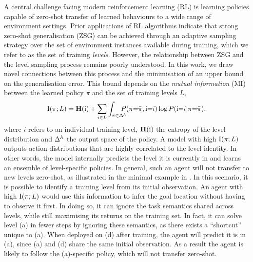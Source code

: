\documentclass{article}
\theoremstyle{plain}
\theoremstyle{definition}
\theoremstyle{remark}
\begin{document}
A central challenge facing modern reinforcement learning (RL) is learning policies capable of zero-shot transfer of learned behaviours to a wide range of environment settings. Prior applications of RL algorithms \citep{rubiks,CLrobloc,fastCLrobloc} indicate that strong zero-shot generalisation (ZSG) can be achieved through an adaptive sampling strategy over the set of environment instances available during training, which we refer to as the set of training \textit{levels}. However, the relationship between ZSG and the level sampling process remains poorly understood. In this work, we draw novel connections between this process and the minimisation of an upper bound on the generalisation error. This bound depends on the \textit{mutual information} (MI) between the learned policy $\pi$ and the set of training levels $L$,
\begin{equation} \label{eq:MI}
\noindent
    \mut{\pi}{L} = \entropy(\ri) + \sum_{i\in L} \int_{\bar{\pi} \in \Delta^\sA}\hspace{-1em} P(\pi{=}\bar{\pi}, \ri{=}i) \log P(\ri{=}i |\pi{=}\bar{\pi}),
\end{equation}
where $i$ refers to an individual training level, $\mathbf{H}({\textnormal{i}})$ the entropy of the level distribution and $\Delta^{\mathbb{A}}$ the output space of the policy. A model with high $\text{I}(\pi;L)$ outputs action distributions that are highly correlated to the level identity. In other words, the model internally predicts the level it is currently in and learns an ensemble of level-specific policies. In general, such an agent will not transfer to new levels zero-shot, as illustrated in the minimal example in . In this scenario, it is possible to identify a training level from its initial observation. An agent with high $\text{I}(\pi;L)$ would use this information to infer the goal location without having to observe it first. In doing so, it can ignore the task semantics shared across levels, while still maximising its returns on the training set. In fact, it can solve level (a) in fewer steps by ignoring these semantics, as there exists a ``shortcut'' unique to (a). When deployed on (d) after training, the agent will predict it is in (a), since (a) and (d) share the same initial observation. As a result the agent is likely to follow the (a)-specific policy, which will not transfer zero-shot.
\end{document}
